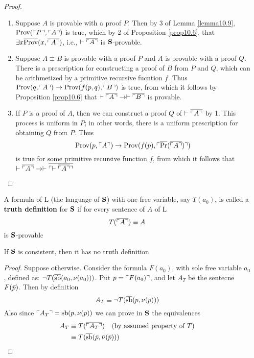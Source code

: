 \documentclass[11pt]{article}
\def \Pr {\text{Pr}}
\def \sb {\text{sb}}
\def \Prov {\text{Prov}}
\newcommand{\ovecor}[1] {\ove{\ucorner{#1}}}
\begin{document}
\begin{proof}
\begin{enumerate}
\item Suppose \(A\) is provable with a proof \(P\). Then by 3 of Lemma \ref{lemma10.9},
\(\Prov(\ucorner{P},\ucorner{A})\) is true, which by 2 of Proposition \ref{prop10.6},
that \(\exists x\ove{\Prov}(x,\ove{\ucorner{A}})\), i.e., \(\vdash\overline{\ulcorner A \urcorner}\) is \(\operatorname{\textbf{S}}\)-provable.
\item Suppose \(A\equiv B\) is provable with a proof \(P\) and \(A\) is provable with a proof \(Q\).
There is a prescription for constructing a proof of \(B\) from \(P\) and \(Q\), which can be
arithmetized by a primitive recursive fucntion \(f\).
Thus \(\Prov(q,\ucorner{A})\to\Prov(f(p,q),\ucorner{B})\) is true, from which it follows by
Proposition \ref{prop10.6} that \(\vdash\overline{\ulcorner A \urcorner}\to\vdash\overline{\ulcorner B \urcorner}\) is
provable.
\item If \(P\) is a proof of \(A\), then we can construct a proof \(Q\) of \(\vdash\ovecor{A}\)
by 1. This process is uniform in \(P\); in other words, there is a uniform prescription for
obtaining \(Q\) from \(P\). Thus
\begin{equation*}
\Prov(p,\ucorner{A})\to\Prov(f(p),\ucorner{\ove{\Pr}(\ovecor{A})})
\end{equation*}
is true for some primitive recursive function \(f\), from which it follows that
\(\vdash\ovecor{A}\to\vdash\ovecor{\vdash \ovecor{A}}\)
\end{enumerate}
\end{proof}

\begin{definition}[]
A formula of L (the language of \(\operatorname{\textbf{S}}\)) with one free variable, say \(T(a_0)\), is called a
\textbf{truth definition} for \(\operatorname{\textbf{S}}\) if for every sentence of \(A\) of L
\begin{equation*}
T(\ovecor{A})\equiv A
\end{equation*}
is \(\operatorname{\textbf{S}}\)-provable
\end{definition}

\begin{theorem}[Tarski]
\label{Problem3}
\label{thm10.11}
If \(\operatorname{\textbf{S}}\) is consistent, then it has no truth definition
\end{theorem}

\begin{proof}



Suppose otherwise. Consider the formula \(F(a_0)\), with sole free variable \(a_0\), defined
as: \(\neg T(\ove{\sb}(a_0,\barnu(a_0)))\). Put \(p=\ulcorner F(a_0) \urcorner\), and let \(A_T\) be the
     sentecne \(F(\bar{p})\). Then by definition
\begin{equation*}
A_T\equiv\neg T(\ove{\sb}(\barp,\barnu(\barp)))
\end{equation*}
Also since \(\ucorner{A_T}=\sb(p,\nu(p))\) we can prove in \(\operatorname{\textbf{S}}\) the equivalences
\begin{align*}
A_T&\equiv T(\ovecor{A_T})\quad(\text{by assumed property of $T$})\\
&\equiv T(\ove{\sb}(\barp,\barnu(\barp)))
\end{align*}
\end{proof}
\end{document}

